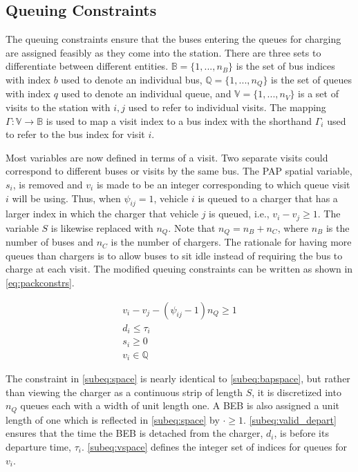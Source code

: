 \documentclass[utf8]{FrontiersinHarvard}
\begin{document}
\subsection{Queuing Constraints}
\label{sec:queuing}
\noindent
The queuing constraints ensure that the buses entering the queues for charging are assigned feasibly as
they come into the station. There are three sets to differentiate between different entities. \(\mathbb{B} = \{1, ...,
n_B\}\) is the set of bus indices with index \(b\) used to denote an individual bus, \(\mathbb{Q} = \{1, ..., n_Q\}\) is the set of
queues with index \(q\) used to denote an individual queue, and \(\mathbb{V} = \{1, ..., n_V\}\) is a set of visits to the
station with \(i,j\) used to refer to individual visits. The mapping \(\Gamma: \mathbb{V} \rightarrow \mathbb{B}\) is used to map a visit
index to a bus index with the shorthand \(\Gamma_i\) used to refer to the bus index for visit \(i\).

Most variables are now defined in terms of a visit. Two separate visits could correspond to different buses or visits by
the same bus. The PAP spatial variable, \(s_i\), is removed and \(v_i\) is made to be an integer corresponding to which
queue visit \(i\) will be using. Thus, when \(\psi_{ij} = 1\), vehicle \(i\) is queued to a charger that has a larger index in
which the charger that vehicle \(j\) is queued, i.e., \(v_i-v_j \geq 1\). The variable \(S\) is likewise replaced with \(n_Q\).
Note that \(n_Q = n_B + n_C\), where \(n_B\) is the number of buses and \(n_C\) is the number of chargers. The rationale for
having more queues than chargers is to allow buses to sit idle instead of requiring the bus to charge at each visit. The
modified queuing constraints can be written as shown in \autoref{eq:packconstrs}.

\begin{subequations}
\label{eq:packconstrs}
\begin{align}
    v_i - v_j - (\psi_{ij} - 1)n_Q \geq 1       \label{subeq:space}        \\
    d_i \leq \tau_i                             \label{subeq:valid_depart} \\
    s_i \geq 0                               \label{subeq:pos_charge} \\
    v_i \in \mathbb{Q}                       \label{subeq:vspace}
\end{align}
\end{subequations}

The constraint in \autoref{subeq:space} is nearly identical to \autoref{subeq:bapspace}, but rather than viewing the
charger as a continuous strip of length \(S\), it is discretized into \(n_Q\) queues each with a width of unit length one. A
BEB is also assigned a unit length of one which is reflected in \autoref{subeq:space} by \(\cdot \geq 1\).
\autoref{subeq:valid_depart} ensures that the time the BEB is detached from the charger, \(d_i\), is before its departure
time, \(\tau_i\). \autoref{subeq:vspace} defines the integer set of indices for queues for \(v_i\).
\end{document}
